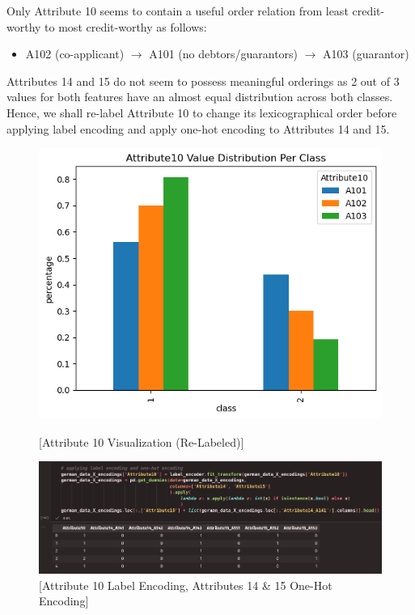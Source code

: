 \documentclass{article}
\begin{document}
    Only Attribute 10 seems to contain a useful order relation from least credit-worthy to most credit-worthy as follows:
    \begin{itemize}
        \item A102 (co-applicant) $\to$ A101 (no debtors/guarantors) $\to$ A103 (guarantor) 
    \end{itemize}
    Attributes 14 and 15 do not seem to possess meaningful orderings as 2 out of 3 values for both features have an almost equal distribution across both classes.
    Hence, we shall re-label Attribute 10 to change its lexicographical order before applying label encoding and apply one-hot encoding to Attributes 14 and 15.
    \begin{figure}[H]
        \centering
        \begin{minipage}[t]{0.35\textwidth}
            \centering
            \includegraphics[width=\textwidth, height=0.2\textheight]{./I_1_g_g.png}
            \caption{[Attribute 10 Visualization (Re-Labeled)]}
        \end{minipage}
        \hfill
        \begin{minipage}[t]{0.62\textwidth}
            \centering
            \includegraphics[width=\textwidth, height=0.15\textheight]{./I_1_g_h.png}
            \caption{[Attribute 10 Label Encoding, Attributes 14 \& 15 One-Hot Encoding]}
        \end{minipage}
    \end{figure}
\end{document}
